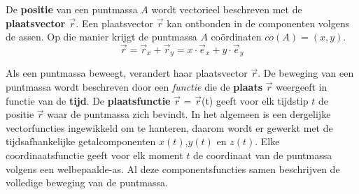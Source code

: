\documentclass{ximera}
\begin{document}
\begin{definition}
	De \textbf{positie} van een puntmassa \(A\) wordt vectorieel beschreven met de \textbf{plaatsvector \(\vec{r}\)}. %
	Een plaatsvector \(\vec{r}\) kan ontbonden in de componenten volgens de assen.
	Op die manier krijgt de puntmassa \(A\) coördinaten \(co(A) = (x,y)\).  
	\[
	\vec{r} = \vec{r}_x + \vec{r}_y = x\cdot\vec{e}_x + y\cdot\vec{e}_y
	\]

\begin{image}[0.3\textwidth]
\end{image}
\end{definition}


Als een puntmassa beweegt, verandert haar plaatsvector \(\vec{r}\).  
De beweging van een puntmassa wordt beschreven door een \textit{functie} die de \textbf{plaats} \(\vec{r}\) weergeeft in functie van de \textbf{tijd}. 
De \textbf{plaatsfunctie} \(\vec{r}\) = \(\vec{r}\)(t) geeft voor elk tijdstip \(t\) de positie \(\vec{r}\) waar de puntmassa zich bevindt. 
In het algemeen is een dergelijke vectorfuncties ingewikkeld om te hanteren, daarom wordt er gewerkt met de tijdsafhankelijke getalcomponenten \(x(t)\),\(y(t)\) en \(z(t)\).
Elke coordinaatsfunctie geeft voor elk moment \(t\) de coordinaat van de puntmassa volgens een welbepaalde-as. 
Al deze componentsfuncties samen beschrijven de volledige beweging van de puntmassa. 
\end{document}

